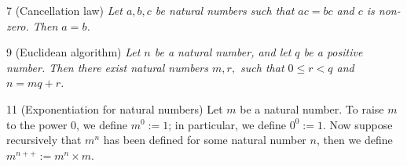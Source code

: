 \begin{corollary}{7}
    \label{nat-mul-cancel}
    (Cancellation law) \emph{Let $a,b,c$ be natural numbers such that $ac=bc$ and $c$ is non-zero. Then $a=b$.}
\end{corollary}


\begin{proposition}{9}
    \label{euclidean-algorithm}
    (Euclidean algorithm) \emph{Let $n$ be a natural number, and let $q$ be a positive number. Then there exist natural numbers $m, r,$ such that $0\leq r < q$ and $n = mq+r$.}
\end{proposition}


\begin{definition}{11}
    \label{nat-exponentiation}
    (Exponentiation for natural numbers) Let $m$ be a natural number. To raise $m$ to the power 0, we define $m^0 := 1$; in particular, we define $0^0 := 1$. Now suppose recursively that $m^n$ has been defined for some natural number $n$, then we define $m^{n++} := m^n \times m$.
\end{definition}

